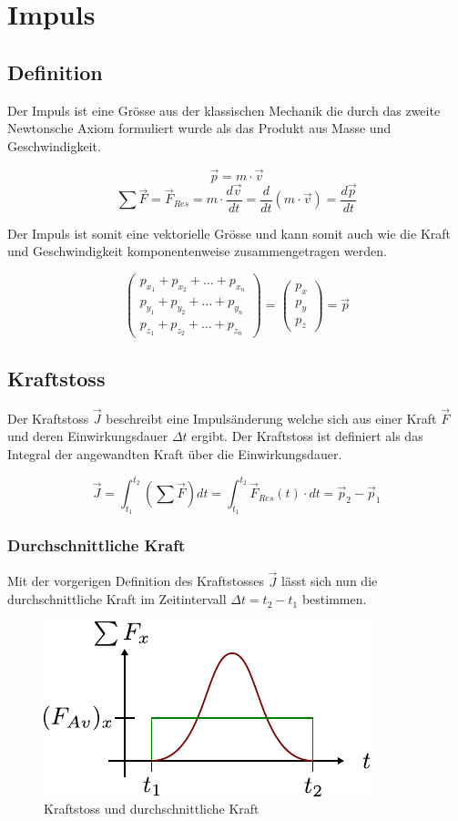 \chapter{Impuls}

\section{Definition}
Der Impuls ist eine Grösse aus der klassischen Mechanik die durch das zweite
Newtonsche Axiom formuliert wurde als das Produkt aus Masse und 
Geschwindigkeit.

\[ \boxed{\vec{p}=m \cdot \vec{v}}  \] 
\[ \sum\vec{F}=\vec{F}_{Res} = m \cdot \frac{d\vec{v}}{dt} =
	\frac{d}{dt}(m \cdot \vec{v}) = \frac{d\vec{p}}{dt}  \]

\noindent
Der Impuls ist somit eine vektorielle Grösse und kann somit auch wie die
Kraft und Geschwindigkeit komponentenweise zusammengetragen werden.

\[\begin{pmatrix} 
	p_{x_1} + p_{x_2} + \dots + p_{x_n} \\
	p_{y_1} + p_{y_2} + \dots + p_{y_n} \\
	p_{z_1} + p_{z_2} + \dots + p_{z_n} 
\end{pmatrix}
=
\begin{pmatrix}
	p_x \\
	p_y \\
	p_z
\end{pmatrix}
= \vec{p}  \]

\section{Kraftstoss}
Der Kraftstoss $\vec{J}$ beschreibt eine Impulsänderung welche sich aus einer 
Kraft $\vec{F}$ und deren Einwirkungsdauer $\Delta t$ ergibt. Der Kraftstoss 
ist definiert als das Integral der angewandten Kraft über die Einwirkungsdauer.

\[ \boxed{\vec{J} = \int_{t_1}^{t_2} \left(\sum \vec{F} \right) dt =
	\int_{t_1}^{t_2}\vec{F}_{Res}(t)\cdot dt = \vec{p}_2 - \vec{p}_1} \]

\subsection{Durchschnittliche Kraft}
Mit der vorgerigen Definition des Kraftstosses $\vec{J}$ lässt sich nun die
durchschnittliche Kraft im Zeitintervall $\Delta t = t_2 - t_1$ bestimmen.

\begin{figure}[h!]
	\centering
	\includegraphics[scale=0.75]{kraftstoss.pdf}
	\caption{Kraftstoss und durchschnittliche Kraft}
	\label{fig:kraftstoss}
\end{figure}

